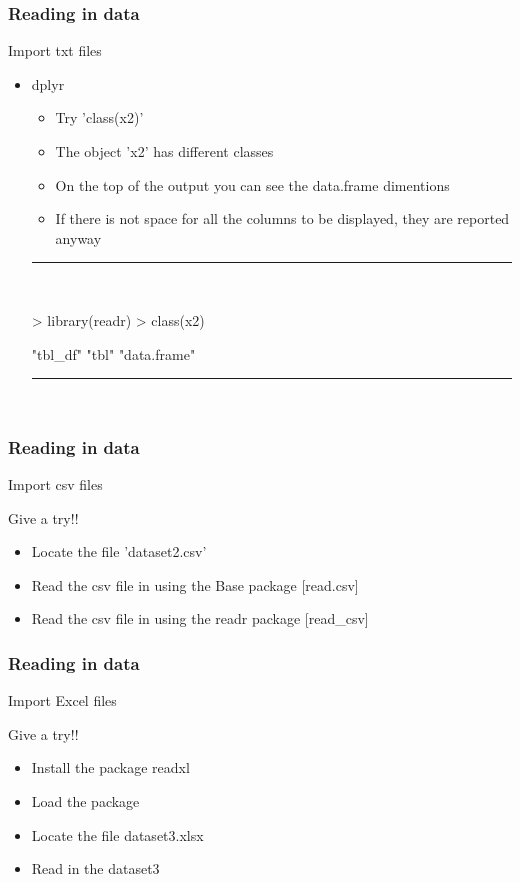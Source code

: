 \documentclass{beamer}
\begin{document}
\begin{frame}[fragile]
	\frametitle{Reading in data}
	\centering \Large Import txt files
	\begin{itemize}
		\small
		\item dplyr
			\begin{itemize}
				\item Try 'class(x2)'
				\item The object 'x2' has different classes
				\item On the top of the output you can see the data.frame dimentions
				\item If there is not space for all the columns to be displayed, they are reported anyway
			\end{itemize}
\rule{\textwidth}{0.4pt}\\
\tiny
\setlength{\fancyvrbtopsep}{-1pt}
\setlength{\fancyvrbpartopsep}{-1pt}
\begin{Schunk}
\begin{Sinput}
> library(readr)
> class(x2)
\end{Sinput}
\begin{Soutput}
[1] "tbl_df"     "tbl"        "data.frame"
\end{Soutput}
\end{Schunk}
\rule{\textwidth}{0.4pt}\\
\small
	
	\end{itemize}
\end{frame}


\begin{frame}[fragile]
	\frametitle{Reading in data}
	\centering \Large Import csv files

	\centering \normalsize Give a try!!
	\begin{itemize}
		\small
		\item Locate the file 'dataset2.csv'
		\item Read the csv file in using the Base package [read.csv]
		\item Read the csv file in using the readr package [read\_csv]
	\end{itemize}
\end{frame}

\begin{frame}[fragile]
	\frametitle{Reading in data}
	\centering \Large Import Excel files

	\centering \normalsize Give a try!!
	\begin{itemize}
		\small
		\item Install the package readxl
		\item Load the package
		\item Locate the file dataset3.xlsx
		\item Read in the dataset3
	\end{itemize}
\end{frame}
\end{document}
